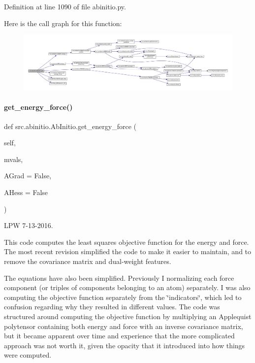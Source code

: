Definition at line 1090 of file abinitio.\+py.

Here is the call graph for this function\+:
\nopagebreak
\begin{figure}[H]
\begin{center}
\leavevmode
\includegraphics[width=350pt]{classsrc_1_1abinitio_1_1AbInitio_a6a5f66c36e73c1ae24f60c042583c71f_cgraph}
\end{center}
\end{figure}
\mbox{\label{classsrc_1_1abinitio_1_1AbInitio_a3b2d4c6ce46dd5e393e2bd6d99f64a48}} 
\paragraph{\texorpdfstring{get\+\_\+energy\+\_\+force()}{get\_energy\_force()}}
{\footnotesize\ttfamily def src.\+abinitio.\+Ab\+Initio.\+get\+\_\+energy\+\_\+force (\begin{DoxyParamCaption}\item[{}]{self,  }\item[{}]{mvals,  }\item[{}]{A\+Grad = {\ttfamily False},  }\item[{}]{A\+Hess = {\ttfamily False} }\end{DoxyParamCaption})}



L\+PW 7-\/13-\/2016. 

This code computes the least squares objective function for the energy and force. The most recent revision simplified the code to make it easier to maintain, and to remove the covariance matrix and dual-\/weight features.

The equations have also been simplified. Previously I normalizing each force component (or triples of components belonging to an atom) separately. I was also computing the objective function separately from the \char`\"{}indicators\char`\"{}, which led to confusion regarding why they resulted in different values. The code was structured around computing the objective function by multiplying an Applequist polytensor containing both energy and force with an inverse covariance matrix, but it became apparent over time and experience that the more complicated approach was not worth it, given the opacity that it introduced into how things were computed.

